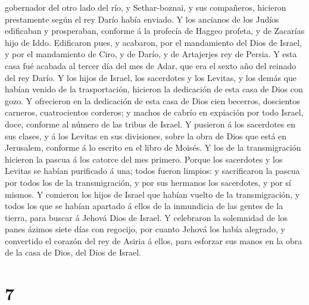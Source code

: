 gobernador del otro lado del río, y Sethar-boznai, y sus compañeros,
hicieron prestamente según el rey Darío había enviado.  Y
los ancianos de los Judíos edificaban y prosperaban, conforme á la
profecía de Haggeo profeta, y de Zacarías hijo de Iddo. Edificaron pues,
y acabaron, por el mandamiento del Dios de Israel, y por el mandamiento
de Ciro, y de Darío, y de Artajerjes rey de Persia.  Y
esta casa fué acabada al tercer día del mes de Adar, que era el sexto
año del reinado del rey Darío.  Y los hijos de Israel,
los sacerdotes y los Levitas, y los demás que habían venido de la
trasportación, hicieron la dedicación de esta casa de Dios con gozo.
 Y ofrecieron en la dedicación de esta casa de Dios cien
becerros, doscientos carneros, cuatrocientos corderos; y machos de
cabrío en expiación por todo Israel, doce, conforme al número de las
tribus de Israel.  Y pusieron á los sacerdotes en sus
clases, y á los Levitas en sus divisiones, sobre la obra de Dios que
está en Jerusalem, conforme á lo escrito en el libro de Moisés.
 Y los de la transmigración hicieron la pascua á los
catorce del mes primero.  Porque los sacerdotes y los
Levitas se habían purificado á una; todos fueron limpios: y sacrificaron
la pascua por todos los de la transmigración, y por sus hermanos los
sacerdotes, y por sí mismos.  Y comieron los hijos de
Israel que habían vuelto de la transmigración, y todos los que se habían
apartado á ellos de la inmundicia de las gentes de la tierra, para
buscar á Jehová Dios de Israel.  Y celebraron la
solemnidad de los panes ázimos siete días con regocijo, por cuanto
Jehová los había alegrado, y convertido el corazón del rey de Asiria á
ellos, para esforzar sus manos en la obra de la casa de Dios, del Dios
de Israel.

\hypertarget{section-6}{%
\section{7}\label{section-6}}

